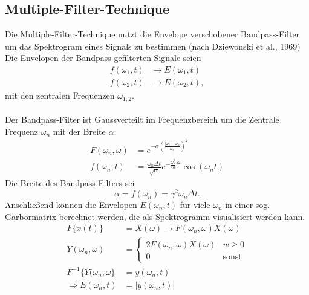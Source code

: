 \subsection{Multiple-Filter-Technique}
Die Multiple-Filter-Technique nutzt die Envelope verschobener Bandpass-Filter um das Spektrogram eines Signals zu bestimmen (nach Dziewonski et al., 1969)\\
Die Envelopen der Bandpass gefilterten Signale seien
\[
\begin{split}
f(\omega_1, t) & \rightarrow E(\omega_1, t)\\
f(\omega_2, t) & \rightarrow E(\omega_2, t),
\end{split}
\]
mit den zentralen Frequenzen $\omega_{1,2}$.\\\\
Der Bandpass-Filter ist Gaussverteilt im Frequenzbereich um die Zentrale Frequenz $\omega_n$ mit der Breite $\alpha$:
\[
\begin{split}
F(\omega_n, \omega) & = e^{-\alpha \left( \frac{|\omega|-\omega_n}{\omega_n} \right)^2}\\
f(\omega_n, t) & = \frac{\omega_n \Delta t}{\sqrt{\alpha}} e^{-\frac{\omega_n^2}{4\alpha} t^2} \cos (\omega_n t)
\end{split}
\]
Die Breite des Bandpass Filters sei
\[
\alpha = f(\omega_n) = \gamma^2 \omega_n \Delta t.
\]
Anschließend können die Envelopen $E(\omega_n, t)$ für viele $\omega_n$ in einer sog. Garbormatrix berechnet werden, die als Spektrogramm visualisiert werden kann.
\[
\begin{split}
F\{x(t)\} & = X(\omega) \rightarrow F(\omega_n, \omega) X(\omega)\\
Y(\omega_n, \omega) & = 
\begin{cases}
2 F(\omega_n, \omega) X(\omega) & w \geq 0\\
0 & \mbox{sonst}
\end{cases}\\
F^{-1}\{Y(\omega_n, \omega\} & = y(\omega_n, t)\\
\Rightarrow E(\omega_n, t) & = |y(\omega_n,t)|
\end{split}
\]

